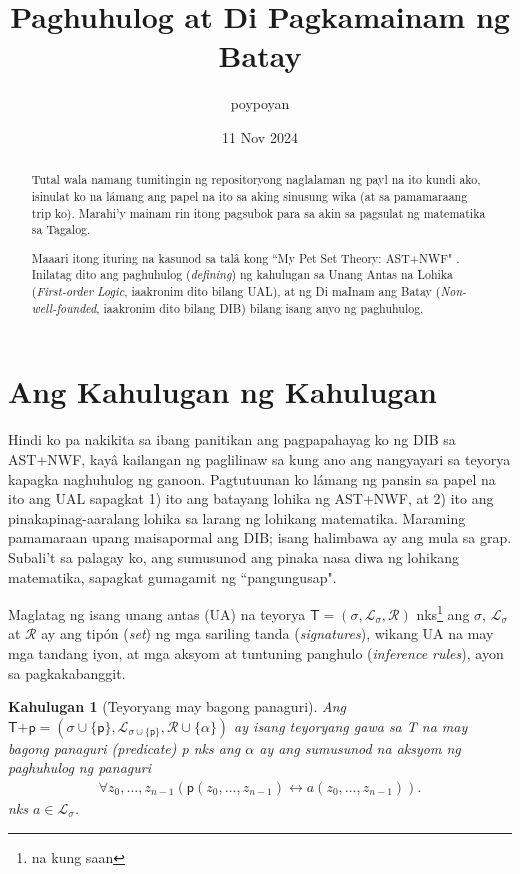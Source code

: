 \documentclass{article}
\title{Paghuhulog at Di Pagkamainam ng Batay}
\author{poypoyan}
\date{11 Nov 2024}   %
\newtheorem{definition}{Kahulugan}[section]
\begin{document}
\maketitle

\begin{abstract}
Tutal wala namang tumitingin ng repositoryong naglalaman ng payl na ito kundi ako, isinulat ko na lámang ang papel na ito sa aking sinusung wika (at sa pamamaraang trip ko). Marahi'y mainam rin itong pagsubok para sa akin sa pagsulat ng matematika sa Tagalog.

Maaari itong ituring na kasunod sa talâ kong ``My Pet Set Theory: \textsf{AST+NWF}" \cite{ast-nwf}. Inilatag dito ang paghuhulog (\textit{defining}) ng kahulugan sa Unang Antas na Lohika (\textit{First-order Logic}, iaakronim dito bilang UAL), at ng Di maInam ang Batay (\textit{Non-well-founded}, iaakronim dito bilang DIB) bilang isang anyo ng paghuhulog.
\end{abstract}

\section{Ang Kahulugan ng Kahulugan}

Hindi ko pa nakikita sa ibang panitikan ang pagpapahayag ko ng DIB sa \textsf{AST+NWF}, kayâ kailangan ng paglilinaw sa kung ano ang nangyayari sa teyorya kapagka naghuhulog ng ganoon. Pagtutuunan ko lámang ng pansin sa papel na ito ang UAL sapagkat 1) ito ang batayang lohika ng \textsf{AST+NWF}, at 2) ito ang pinakapinag-aaralang lohika sa larang ng lohikang matematika. Maraming pamamaraan upang maisapormal ang DIB; isang halimbawa ay ang mula sa grap. Subali't sa palagay ko, ang sumusunod ang pinaka nasa diwa ng lohikang matematika, sapagkat gumagamit ng ``pangungusap".

Maglatag ng isang unang antas (UA) na teyorya $\textsf{T} = (\sigma, \mathcal{L}_\sigma, \mathcal{R})$ nks\footnote{na kung saan} ang $\sigma$, $\mathcal{L}_\sigma$ at $\mathcal{R}$ ay ang tipón (\textit{set}) ng mga sariling tanda (\textit{signatures}), wikang UA na may mga tandang iyon, at mga aksyom at tuntuning panghulo (\textit{inference rules}), ayon sa pagkakabanggit.

\begin{definition}[Teyoryang may bagong panaguri]
\label{paghuhulog}
Ang $\textsf{T+p} = (\sigma \cup \{\textsf{p}\}, \mathcal{L}_{\sigma \cup \{\textsf{p}\}}, \mathcal{R} \cup \{\alpha\})$ ay isang teyoryang gawa sa \textsf{T} na may bagong panaguri (\textit{predicate}) \textsf{p} nks ang $\alpha$ ay ang sumusunod na aksyom ng paghuhulog ng panaguri
\begin{align}
\forall z_0, \ldots, z_{n-1}(\textsf{p}(z_0, \ldots, z_{n-1}) \leftrightarrow a(z_0, \ldots, z_{n-1})).
\end{align}
nks $a \in \mathcal{L}_\sigma$.
\end{definition}
\end{document}
